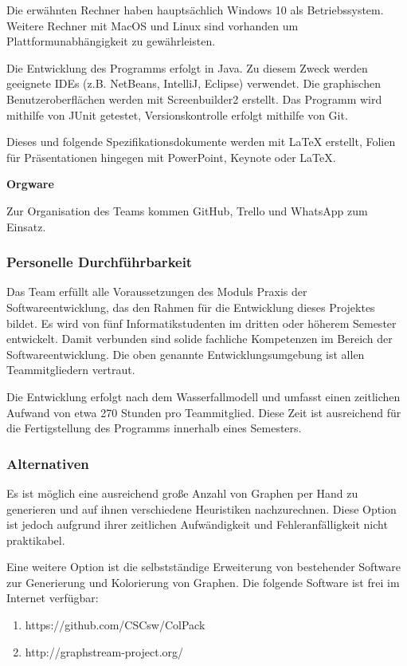 \documentclass{article}
\begin{document}
	Die erwähnten Rechner haben hauptsächlich Windows 10 als Betriebssystem. Weitere Rechner mit MacOS und Linux sind vorhanden um Plattformunabhängigkeit zu gewährleisten.
	
	Die Entwicklung des Programms erfolgt in Java. Zu diesem Zweck werden geeignete IDEs (z.B. NetBeans, IntelliJ, Eclipse) verwendet. Die graphischen Benutzeroberflächen werden mit Screenbuilder2 erstellt. Das Programm wird mithilfe von JUnit getestet, Versionskontrolle erfolgt mithilfe von Git.
	
	Dieses und folgende Spezifikationsdokumente werden mit LaTeX erstellt, Folien für Präsentationen hingegen mit PowerPoint, Keynote oder LaTeX.
	\newline
	
	\textbf{Orgware}
	
	Zur Organisation des Teams kommen GitHub, Trello und WhatsApp zum Einsatz.
	
	\subsubsection{Personelle Durchführbarkeit}
	Das Team erfüllt alle Voraussetzungen des Moduls Praxis der Softwareentwicklung, das den Rahmen für die Entwicklung dieses Projektes bildet. Es wird von fünf Informatikstudenten im dritten oder höherem Semester entwickelt. Damit verbunden sind solide fachliche Kompetenzen im Bereich der Softwareentwicklung. Die oben genannte Entwicklungsumgebung ist allen Teammitgliedern vertraut.
	
	Die Entwicklung erfolgt nach dem Wasserfallmodell und umfasst einen zeitlichen Aufwand von etwa 270 Stunden pro Teammitglied. Diese Zeit ist ausreichend für die Fertigstellung des Programms innerhalb eines Semesters.
	
	
	\subsubsection{Alternativen}
	Es ist möglich eine ausreichend große Anzahl von Graphen per Hand zu generieren und auf ihnen verschiedene Heuristiken nachzurechnen. Diese Option ist jedoch aufgrund ihrer zeitlichen Aufwändigkeit und Fehleranfälligkeit nicht praktikabel.
	
	Eine weitere Option ist die selbstständige Erweiterung von bestehender Software zur Generierung und Kolorierung von Graphen. Die folgende Software ist frei im Internet verfügbar:
	\begin{enumerate}[--]
		\item{https://github.com/CSCsw/ColPack}
		\item{http://graphstream-project.org/}
	\end{enumerate}
	
\end{document}
